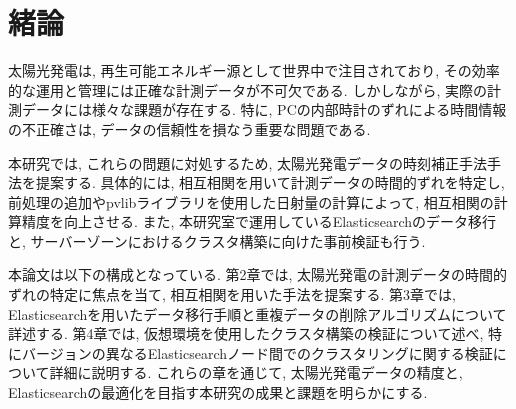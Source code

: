 \chapter{緒論}
\label{chap:first}

太陽光発電は, 再生可能エネルギー源として世界中で注目されており, その効率的な運用と管理には正確な計測データが不可欠である. しかしながら, 実際の計測データには様々な課題が存在する. 特に, PCの内部時計のずれによる時間情報の不正確さは, データの信頼性を損なう重要な問題である.

本研究では, これらの問題に対処するため, 太陽光発電データの時刻補正手法手法を提案する. 具体的には, 相互相関を用いて計測データの時間的ずれを特定し, 前処理の追加やpvlibライブラリを使用した日射量の計算によって, 相互相関の計算精度を向上させる. また, 本研究室で運用しているElasticsearchのデータ移行と, サーバーゾーンにおけるクラスタ構築に向けた事前検証も行う.

本論文は以下の構成となっている. 第2章では, 太陽光発電の計測データの時間的ずれの特定に焦点を当て, 相互相関を用いた手法を提案する. 第3章では, Elasticsearchを用いたデータ移行手順と重複データの削除アルゴリズムについて詳述する. 第4章では, 仮想環境を使用したクラスタ構築の検証について述べ, 特にバージョンの異なるElasticsearchノード間でのクラスタリングに関する検証について詳細に説明する. これらの章を通じて, 太陽光発電データの精度と, Elasticsearchの最適化を目指す本研究の成果と課題を明らかにする.